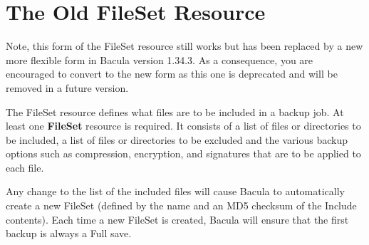 
\section*{The Old FileSet Resource}
\label{_ChapterStart}
\label{FileSetResource}

Note, this form of the FileSet resource still works but has been replaced by a
new more flexible form in Bacula version 1.34.3. As a consequence, you are
encouraged to convert to the new form as this one is deprecated and will be
removed in a future version. 

The FileSet resource defines what files are to be included in a backup job. At
least one {\bf FileSet} resource is required. It consists of a list of files
or directories to be included, a list of files or directories to be excluded
and the various backup options such as compression, encryption, and signatures
that are to be applied to each file. 

Any change to the list of the included files will cause Bacula to
automatically create a new FileSet (defined by the name and an MD5 checksum of
the Include contents). Each time a new FileSet is created, Bacula will ensure
that the first backup is always a Full save. 

